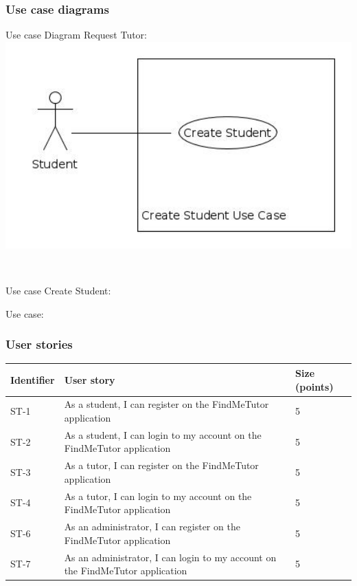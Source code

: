 \documentclass[12pt]{article}
\begin{document}
{\subsubsection{Use case diagrams}
Use case Diagram Request Tutor:
		\centering
		\includegraphics[width=140mm]{./Use_Cases/Create_Student.jpg}

\

Use case Create Student:

\newpage
Use case:

\newpage
\subsubsection{User stories}
{
\centering
\begin{longtable}{| l | p{10cm}| l |}
			\hline
			\textbf{Identifier} & \textbf{User story} & \textbf{Size (points)}

			\\ \hline ST-1 & As a student, I can  register on the FindMeTutor application  & 5
			\\ \hline ST-2 & As a student, I can  login to my account on the FindMeTutor application  & 5
			\\ \hline ST-3 & As a tutor, I can  register on the FindMeTutor application  & 5
																\\ \hline ST-4 & As a tutor, I can  login to my account on the FindMeTutor application  & 5
																\\ \hline ST-6 & As an administrator, I can  register on the FindMeTutor application  & 5
													\\ \hline ST-7 & As an administrator, I can  login to my account on the FindMeTutor application  & 5


\end{longtable}}}
\end{document}
